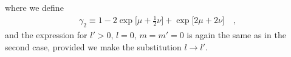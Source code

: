\documentclass[modern]{aastex62}
\begin{document}
%
where we define
%
\begin{align}
    \gamma_2 \equiv 1
    - 2\exp\bigg[ \mu + \frac{1}{2}\nu\bigg]
    + \exp\bigg[ 2\mu + 2\nu\bigg]
    \quad,
\end{align}
%
and the expression for $l' > 0, \, l = 0, \, m = m' = 0$ is again the same as in
the second case, provided we make the substitution $l \rightarrow l'$.

%
\end{document}
